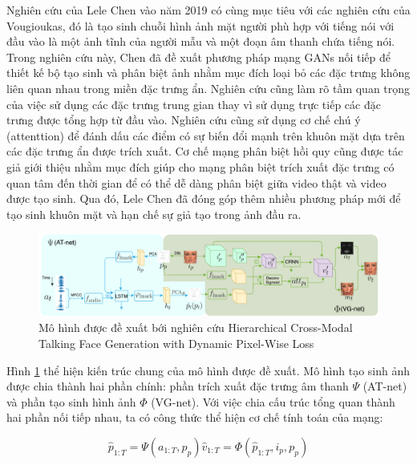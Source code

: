 Nghiên cứu của Lele Chen vào năm 2019 có cùng mục tiêu với các nghiên cứu của Vougioukas, đó là tạo sinh chuỗi hình ảnh mặt người phù hợp với tiếng nói với đầu vào là một ảnh tĩnh của người mẫu và một đoạn âm thanh chứa tiếng nói. Trong nghiên cứu này, Chen đã đề xuất phương pháp mạng GANs nối tiếp để thiết kế bộ tạo sinh và phân biệt ảnh nhằm mục đích loại bỏ các đặc trưng không liên quan nhau trong miền đặc trưng ẩn. Nghiên cứu cũng làm rõ tầm quan trọng của việc sử dụng các đặc trưng trung gian thay vì sử dụng trực tiếp các đặc trưng được tổng hợp từ đầu vào. Nghiên cứu cũng sử dụng cơ chế chú ý (attenttion) để đánh dấu các điểm có sự biến đổi mạnh trên khuôn mặt dựa trên các đặc trưng ẩn được trích xuất. Cơ chế mạng phân biệt hồi quy cũng được tác giả giới thiệu nhằm mục đích giúp cho mạng phân biệt trích xuất đặc trưng có quan tâm đến thời gian để có thể dễ dàng phân biệt giữa video thật và video được tạo sinh. Qua đó, Lele Chen đã đóng góp thêm nhiều phương pháp mới để tạo sinh khuôn mặt và hạn chế sự giả tạo trong ảnh đầu ra. 

\begin{figure}[H]
    \centering
    \includegraphics[width=15cm]{./content/images/chen2019_model.png}
    \caption{Mô hình được đề xuất bới nghiên cứu Hierarchical Cross-Modal Talking Face Generation with Dynamic Pixel-Wise Loss}
    \label{fig:chen2019_model}
\end{figure}

Hình \ref{fig:chen2019_model} thể hiện kiến trúc chung của mô hình được đề xuất. Mô hình tạo sinh ảnh được chia thành hai phần chính: phần trích xuất đặc trưng âm thanh $\Psi$ (AT-net) và phần tạo sinh hình ảnh $\Phi$ (VG-net). Với việc chia cấu trúc tổng quan thành hai phần nối tiếp nhau, ta có công thức thể hiện cơ chế tính toán của mạng:

\begin{subequations}
    \begin{equation}
        \hat{p}_{1:T} = \Psi(a_{1:T}, p_p)
    \end{equation}
    \begin{equation}
        \hat{v}_{1:T} = \Phi(\hat{p}_{1:T}, i_p, p_p)
    \end{equation}
\end{subequations}

